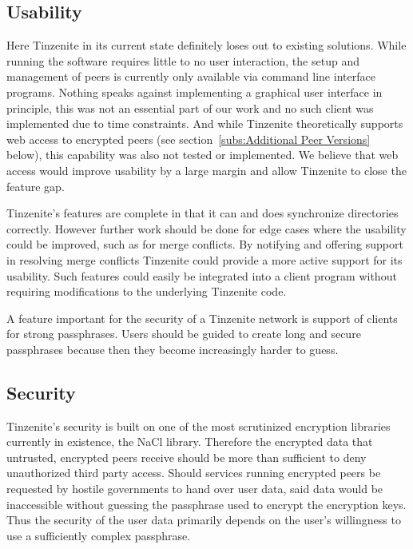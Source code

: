 \subsection{Usability}
\label{sub:Usability}

Here Tinzenite in its current state definitely loses out to existing solutions.
While running the software requires little to no user interaction, the setup and management of peers is currently only available via command line interface programs.
Nothing speaks against implementing a graphical user interface in principle, this was not an essential part of our work and no such client was implemented due to time constraints.
And while Tinzenite theoretically supports web access to encrypted peers (see section~\ref{subs:Additional Peer Versions} below), this capability was also not tested or implemented.
We believe that web access would improve usability by a large margin and allow Tinzenite to close the feature gap.

Tinzenite's features are complete in that it can and does synchronize directories correctly.
However further work should be done for edge cases where the usability could be improved, such as for merge conflicts.
By notifying and offering support in resolving merge conflicts Tinzenite could provide a more active support for its usability.
Such features could easily be integrated into a client program without requiring modifications to the underlying Tinzenite code.

A feature important for the security of a Tinzenite network is support of clients for strong passphrases.
Users should be guided to create long and secure passphrases because then they become increasingly harder to guess.

\subsection{Security}
\label{sub:Security}

Tinzenite's security is built on one of the most scrutinized encryption libraries currently in existence, the NaCl library.
Therefore the encrypted data that untrusted, encrypted peers receive should be more than sufficient to deny unauthorized third party access.
Should services running encrypted peers be requested by hostile governments to hand over user data, said data would be inaccessible without guessing the passphrase used to encrypt the encryption keys.
Thus the security of the user data primarily depends on the user's willingness to use a sufficiently complex passphrase.


